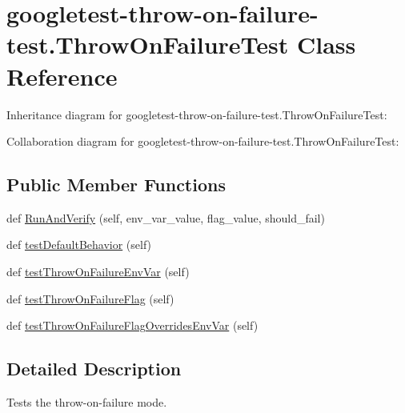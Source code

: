 \hypertarget{classgoogletest-throw-on-failure-test_1_1ThrowOnFailureTest}{}\section{googletest-\/throw-\/on-\/failure-\/test.Throw\+On\+Failure\+Test Class Reference}
\label{classgoogletest-throw-on-failure-test_1_1ThrowOnFailureTest}


Inheritance diagram for googletest-\/throw-\/on-\/failure-\/test.Throw\+On\+Failure\+Test\+:


Collaboration diagram for googletest-\/throw-\/on-\/failure-\/test.Throw\+On\+Failure\+Test\+:
\subsection*{Public Member Functions}
\begin{DoxyCompactItemize}
\item 
def \hyperlink{classgoogletest-throw-on-failure-test_1_1ThrowOnFailureTest_ac9966623ba3bbd94be99aef689db43f3}{Run\+And\+Verify} (self, env\+\_\+var\+\_\+value, flag\+\_\+value, should\+\_\+fail)
\item 
def \hyperlink{classgoogletest-throw-on-failure-test_1_1ThrowOnFailureTest_a55494f56e9674d086077e82583e8f823}{test\+Default\+Behavior} (self)
\item 
def \hyperlink{classgoogletest-throw-on-failure-test_1_1ThrowOnFailureTest_a8ab58ce03ffb9fa474a6c9282bb13021}{test\+Throw\+On\+Failure\+Env\+Var} (self)
\item 
def \hyperlink{classgoogletest-throw-on-failure-test_1_1ThrowOnFailureTest_aeded6eb7d9c7e95f4d18768c4a767eaf}{test\+Throw\+On\+Failure\+Flag} (self)
\item 
def \hyperlink{classgoogletest-throw-on-failure-test_1_1ThrowOnFailureTest_a18515553dbfe7b3e6ed6449fa81893c1}{test\+Throw\+On\+Failure\+Flag\+Overrides\+Env\+Var} (self)
\end{DoxyCompactItemize}


\subsection{Detailed Description}
\begin{DoxyVerb}Tests the throw-on-failure mode.\end{DoxyVerb}
 

